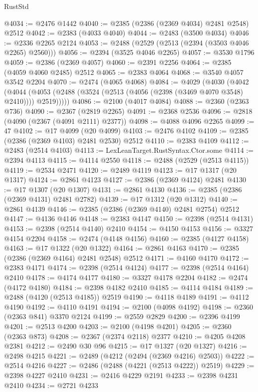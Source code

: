 \begin{lexlean}{RustStd}
\begin{coremodule}
{\begin{coremodule}
{{{{{{{{{{{{{{{{{{{{{{{{{{{{{{{{{{{{{{{{{{{{{{{{{{@4034 := @2476 @1442
@4040 := @2385 (@2386 (@2369 @4034) @2481 @2548) @2512
@4042 := @2383 (@4033 @4040)
@4044 := @2483 (@3500 @4034)
@4046 := @2336 @2265 @2124
@4053 := @2488 (@2529 (@2513 (@2394 (@3503 @4046 @2265) @2560)))
@4056 := @2394 (@3525 @4046 @2265)
@4057 := @3530 @1796
@4059 := @2386 (@2369 @4057)
@4060 := @2391 @2256
@4064 := @2385 (@4059 @4060 @2485) @2512
@4065 := @2383 @4064
@4068 := @3540 @4057 @3542 @2204
@4070 := @2474 (@4065 @4068)
@4084 := @4029
    (@4030
      (@4042
        (@4044 (@4053 (@2488 (@3524 (@2513 (@4056 (@2398 (@3469 @4070 @3548) @2410)))) @2519)))))
@4086 := @2100 (@4017 @4084)
@4088 := @2360 (@2363 @736)
@4090 := @2367 (@2819 @2265)
@4091 := @2368 @2536
@4096 := @2818 (@4090 (@2367 (@4091 @2111) @2377))
@4098 := @4088 @4096 @2265
@4099 := 47
@4102 := @17 @4099 (@20 @4099)
@4103 := @2476 @4102
@4109 := @2385 (@2386 (@2369 @4103) @2481 @2530) @2512
@4110 := @2383 @4109
@4112 := @2483 (@2514 @4103)
@4113 := LexLeanTarget.RustSyntax.Ctor.some
@4114 := @2394 @4113
@4115 := @4114 @2550
@4118 := @2488 (@2529 (@2513 @4115))
@4119 := @2534 @2471
@4120 := @2489 @4119
@4123 := @17 @1317 (@20 @1317)
@4124 := @2861 @4123
@4127 := @2386 (@2369 @4124) @2481
@4130 := @17 @1307 (@20 @1307)
@4131 := @2861 @4130
@4136 := @2385 (@2386 (@2369 @4131) @2481 @2782)
@4139 := @17 @1312 (@20 @1312)
@4140 := @2861 @4139
@4146 := @2385 (@2386 (@2369 @4140) @2481 @2754) @2512
@4147 := @4136 @4146
@4148 := @2383 @4147
@4150 := @2398 (@2514 @4131)
@4153 := @2398 (@2514 @4140) @2410
@4154 := @4150 @4153
@4156 := @3327 @4154 @2204
@4158 := @2474 (@4148 @4156)
@4160 := @2385 (@4127 @4158)
@4163 := @17 @1322 (@20 @1322)
@4164 := @2861 @4163
@4170 := @2385 (@2386 (@2369 @4164) @2481 @2548) @2512
@4171 := @4160 @4170
@4172 := @2383 @4171
@4174 := @2398 (@2514 @4124)
@4177 := @2398 (@2514 @4164) @2410
@4178 := @4174 @4177
@4180 := @3327 @4178 @2204
@4182 := @2474 (@4172 @4180)
@4184 := @2398 @4182 @2410
@4185 := @4114 @4184
@4189 := @2488 (@4120 (@2513 @4185)) @2519
@4190 := @4118 @4189
@4191 := @4112 @4190
@4192 := @4110 @4191
@4194 := @2100 (@4098 @4192)
@4198 := @2360 (@2363 @841) @3370 @2124
@4199 := @2559 @2829
@4200 := @2396 @4199
@4201 := @2513 @4200
@4203 := @2100 (@4198 @4201)
@4205 := @2360 (@2363 @873)
@4208 := @2367 (@2374 @2118) @2377
@4210 := @4205 @4208 @2381
@4212 := @2490 @30 @96
@4215 := @17 @1327 (@20 @1327)
@4216 := @2498 @4215
@4221 := @2489 (@4212 (@2494 (@2369 @4216) @2503))
@4222 := @2514 @4216
@4227 := @2486 (@2488 (@4221 (@2513 @4222)) @2519)
@4229 := @2398 @4227 @2410
@4231 := @2416 @4229 @2191
@4233 := @2398 @4231 @2410
@4234 := @2721 @4233
}}}}}}}}}}}}}}}}}}}}}}}}}}}}}}}}}}}}}}}}}}}}}}}}}}
\end{coremodule}}
\end{coremodule}
\end{lexlean}

